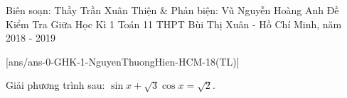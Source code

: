 \begin{name}
{Biên soạn: Thầy Trần Xuân Thiện \& Phản biện: Vũ Nguyễn Hoàng Anh}
{Đề Kiểm Tra Giữa Học Kì 1 Toán 11 THPT Bùi Thị Xuân - Hồ Chí Minh, năm 2018 - 2019}
\end{name}

\setcounter{ex}{0}\setcounter{bt}{0}
[ans/ans-0-GHK-1-NguyenThuongHien-HCM-18(TL)]
\begin{bt} %
Giải phương trình sau: 
$\sin x+\sqrt{3} \cos x = \sqrt{2}$.
\end{bt}

